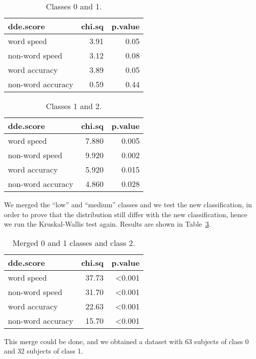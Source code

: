 \documentclass[11pt, a4paper, twoside, openright]{article}
\begin{document}
\begin{table}[ht]
\centering
\begin{tabular}{lrr}
  \hline
dde.score & chi.sq & p.value \\ 
  \hline
word speed & 3.91 & 0.05 \\ 
  non-word speed & 3.12 & 0.08 \\ 
  word accuracy & 3.89 & 0.05 \\ 
  non-word accuracy & 0.59 & 0.44 \\ 
   \hline
\end{tabular}
\caption{Classes 0 and 1.}
\label{tab:1}
\end{table}

\begin{table}[ht]
\centering
\begin{tabular}{lrr}
  \hline
dde.score & chi.sq & p.value \\ 
  \hline
word speed & 7.880 & 0.005 \\ 
  non-word speed & 9.920 & 0.002 \\ 
  word accuracy & 5.920 & 0.015 \\ 
  non-word accuracy & 4.860 & 0.028 \\ 
   \hline
\end{tabular}
\caption{Classes 1 and 2.}
\label{tab:2}
\end{table}

We merged the ``low'' and ``medium'' classes and we test the new
classification, in order to prove that the distribution still differ
with the new classification, hence we run the Kruskal-Wallis test
again. Results are shown in Table~\ref{tab:3}.

\begin{table}[ht]
\centering
\begin{tabular}{lrr}
  \hline
dde.score & chi.sq & p.value \\ 
  \hline
word speed & 37.73 & <0.001 \\ 
  non-word speed & 31.70 & <0.001 \\ 
  word accuracy & 22.63 & <0.001 \\ 
  non-word accuracy & 15.70 & <0.001 \\ 
   \hline
\end{tabular}
\caption{Merged 0 and 1 classes and class 2.}
\label{tab:3}
\end{table}
This merge could be done, and we obtained a dataset with 63 subjects
of class 0 and 32 subjects of class 1.
\end{document}
